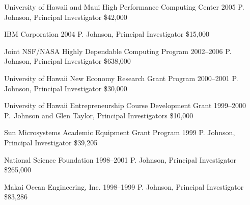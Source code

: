 \documentclass[11pt,letterpaper,sans]{moderncv} %
\begin{document}
        {University of Hawaii and Maui High Performance Computing Center} %
        {2005} %
        {P. Johnson, Principal Investigator}  %
        {\$42,000} %

        {IBM Corporation} %
        {2004} %
        {P. Johnson, Principal Investigator}  %
        {\$15,000} %

        {Joint NSF/NASA Highly Dependable Computing Program} %
        {2002--2006} %
        {P. Johnson, Principal Investigator}  %
        {\$638,000} %

        {University of Hawaii New Economy Research Grant Program} %
        {2000--2001} %
        {P. Johnson, Principal Investigator}  %
        {\$30,000} %

        {University of Hawaii Entrepreneurship Course Development Grant} %
        {1999--2000} %
        {P.~Johnson and Glen Taylor, Principal Investigators}  %
        {\$10,000} %

        {Sun Microsystems Academic Equipment Grant Program} %
        {1999} %
        {P. Johnson, Principal Investigator}  %
        {\$39,205} %

        {National Science Foundation} %
        {1998--2001} %
        {P. Johnson, Principal Investigator}  %
        {\$265,000} %

        {Makai Ocean Engineering, Inc.} %
        {1998--1999} %
        {P. Johnson, Principal Investigator}  %
        {\$83,286} %
\end{document}
